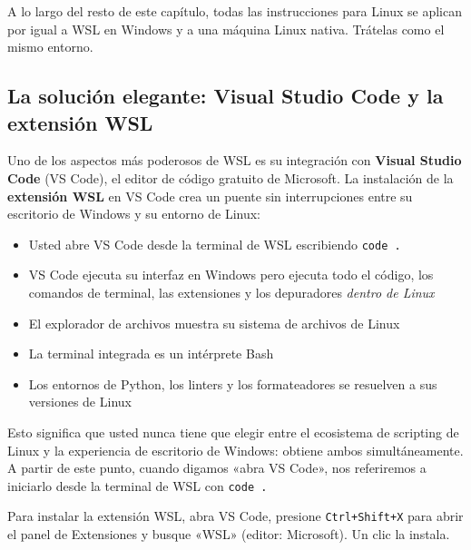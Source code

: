 \begin{notebox}
A lo largo del resto de este capítulo, todas las instrucciones para Linux
se aplican por igual a WSL en Windows y a una máquina Linux nativa.
Trátelas como el mismo entorno.
\end{notebox}

\subsection{La solución elegante: Visual Studio Code y la extensión WSL}
\label{subsec:vscode-wsl}

Uno de los aspectos más poderosos de WSL es su integración con
\textbf{Visual Studio Code} (VS Code), el editor de código gratuito de
Microsoft. La instalación de la \textbf{extensión WSL} en VS Code crea un
puente sin interrupciones entre su escritorio de Windows y su entorno de
Linux:

\begin{itemize}
  \item Usted abre VS Code desde la terminal de WSL escribiendo
        \texttt{code .}
  \item VS Code ejecuta su interfaz en Windows pero ejecuta todo el código,
        los comandos de terminal, las extensiones y los depuradores
        \emph{dentro de Linux}
  \item El explorador de archivos muestra su sistema de archivos de Linux
  \item La terminal integrada es un intérprete Bash
  \item Los entornos de Python, los linters y los formateadores se resuelven
        a sus versiones de Linux
\end{itemize}

Esto significa que usted nunca tiene que elegir entre el ecosistema de
scripting de Linux y la experiencia de escritorio de Windows: obtiene ambos
simultáneamente. A partir de este punto, cuando digamos «abra VS Code»,
nos referiremos a iniciarlo desde la terminal de WSL con \texttt{code .}

\begin{tipbox}
Para instalar la extensión WSL, abra VS Code, presione
\texttt{Ctrl+Shift+X} para abrir el panel de Extensiones y busque
«WSL» (editor: Microsoft). Un clic la instala.
\end{tipbox}

